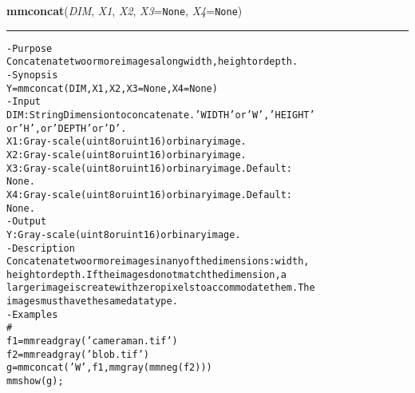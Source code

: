     \begin{boxedminipage}{\textwidth}

    \raggedright \textbf{mmconcat}(\textit{DIM}, \textit{X1}, \textit{X2}, \textit{X3}=\texttt{N\-o\-n\-e\-}, \textit{X4}=\texttt{N\-o\-n\-e\-})

    \vspace{-1.5ex}

    \rule{\textwidth}{0.5\fboxrule}
\begin{alltt}
- Purpose
    Concatenate two or more images along width, height or depth.
- Synopsis
    Y = mmconcat(DIM, X1, X2, X3=None, X4=None)
- Input
    DIM: String Dimension to concatenate. 'WIDTH' or 'W', 'HEIGHT'
         or 'H', or ' DEPTH' or 'D'.
    X1:  Gray-scale (uint8 or uint16) or binary image.
    X2:  Gray-scale (uint8 or uint16) or binary image.
    X3:  Gray-scale (uint8 or uint16) or binary image. Default:
         None.
    X4:  Gray-scale (uint8 or uint16) or binary image. Default:
         None.
- Output
    Y: Gray-scale (uint8 or uint16) or binary image.
- Description
    Concatenate two or more images in any of the dimensions: width,
    height or depth. If the images do not match the dimension, a
    larger image is create with zero pixels to accommodate them. The
    images must have the same datatype.
- Examples
    \#
    f1=mmreadgray('cameraman.tif')
    f2=mmreadgray('blob.tif')
    g=mmconcat('W',f1,mmgray(mmneg(f2)))
    mmshow(g);\end{alltt}

    \vspace{1ex}

    \end{boxedminipage}

    \label{multireg:num_pymorph:mmcthick}
    \vspace{0.5ex}

